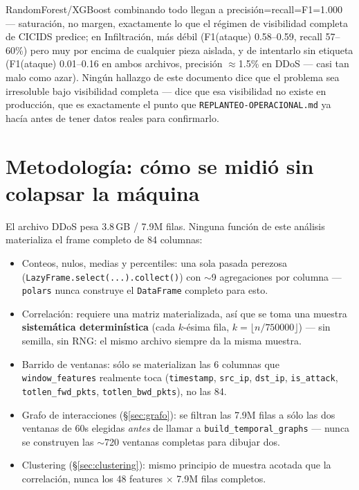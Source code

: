 \documentclass[11pt]{article}
\newcommand{\code}[1]{\texttt{\small #1}}
\begin{document}
\begin{itemize}[leftmargin=1.4em]
  RandomForest/XGBoost combinando todo llegan a precisión=recall=F1=1.000 --- saturación,
  no margen, exactamente lo que el régimen de visibilidad completa de CICIDS predice; en
  Infiltración, más débil (F1(ataque) 0.58--0.59, recall 57--60\%) pero muy por encima de
  cualquier pieza aislada, y de intentarlo sin etiqueta (F1(ataque) 0.01--0.16 en ambos
  archivos, precisión $\approx$1.5\% en DDoS --- casi tan malo como azar). Ningún hallazgo
  de este documento dice que el problema sea irresoluble bajo visibilidad completa ---
  dice que esa visibilidad no existe en producción, que es exactamente el punto que
  \code{REPLANTEO-OPERACIONAL.md} ya hacía antes de tener datos reales para confirmarlo.
\end{itemize}

\section{Metodología: cómo se midió sin colapsar la máquina}
\label{sec:metodo}

El archivo DDoS pesa 3.8\,GB / 7.9M filas. Ninguna función de este análisis materializa el
frame completo de 84 columnas:

\begin{itemize}[leftmargin=1.4em]
\item Conteos, nulos, medias y percentiles: una sola pasada perezosa
  (\code{LazyFrame.select(...).collect()}) con $\sim$9 agregaciones por columna --- \code{polars}
  nunca construye el \code{DataFrame} completo para esto.
\item Correlación: requiere una matriz materializada, así que se toma una muestra
  \textbf{sistemática determinística} (cada $k$-ésima fila, $k = \lfloor n/750000 \rfloor$)
  --- sin semilla, sin RNG: el mismo archivo siempre da la misma muestra.
\item Barrido de ventanas: sólo se materializan las 6 columnas que
  \code{window\_features} realmente toca (\code{timestamp}, \code{src\_ip}, \code{dst\_ip},
  \code{is\_attack}, \code{totlen\_fwd\_pkts}, \code{totlen\_bwd\_pkts}), no las 84.
\item Grafo de interacciones (\S\ref{sec:grafo}): se filtran las 7.9M filas a sólo las dos
  ventanas de 60s elegidas \emph{antes} de llamar a \code{build\_temporal\_graphs} --- nunca
  se construyen las $\sim$720 ventanas completas para dibujar dos.
\item Clustering (\S\ref{sec:clustering}): mismo principio de muestra acotada que la
  correlación, nunca los 48 features $\times$ 7.9M filas completos.
\end{itemize}
\end{document}
